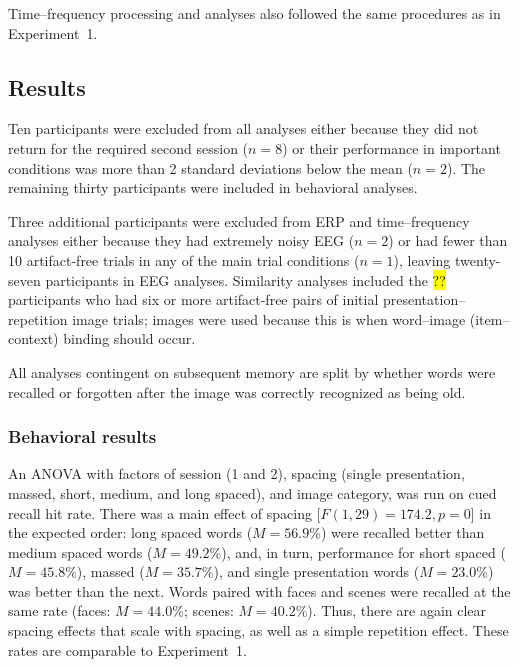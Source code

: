 Time--frequency processing and analyses also followed the same procedures as in Experiment~1.

\subsection{Results}





Ten participants were excluded from all analyses either because they did not return for the required second session ($n=8$) or their performance in important conditions was more than 2 standard deviations below the mean ($n=2$).  The remaining thirty participants were included in behavioral analyses.

Three additional participants were excluded from ERP and time--frequency analyses either because they had extremely noisy EEG ($n=2$) or had fewer than 10 artifact-free trials in any of the main trial conditions ($n=1$), leaving twenty-seven participants in EEG analyses.  Similarity analyses included the \hl{??} participants who had six or more artifact-free pairs of initial presentation--repetition image trials; images were used because this is when word--image (item--context) binding should occur.

All analyses contingent on subsequent memory are split by whether words were recalled or forgotten after the image was correctly recognized as being old.

\subsubsection{Behavioral results}

An ANOVA with factors of session (1 and 2), spacing (single presentation, massed, short, medium, and long spaced), and image category, was run on cued recall hit rate.  There was a main effect of spacing [$F(1,29)=174.2, p=0$] in the expected order: long spaced words ($M=56.9\%$) were recalled better than medium spaced words ($M=49.2\%$), and, in turn, performance for short spaced ($M=45.8\%$), massed ($M=35.7\%$), and single presentation words ($M=23.0\%$) was better than the next.  Words paired with faces and scenes were recalled at the same rate (faces: $M=44.0\%$; scenes: $M=40.2\%$).  Thus, there are again clear spacing effects that scale with spacing, as well as a simple repetition effect. These rates are comparable to Experiment~1.

